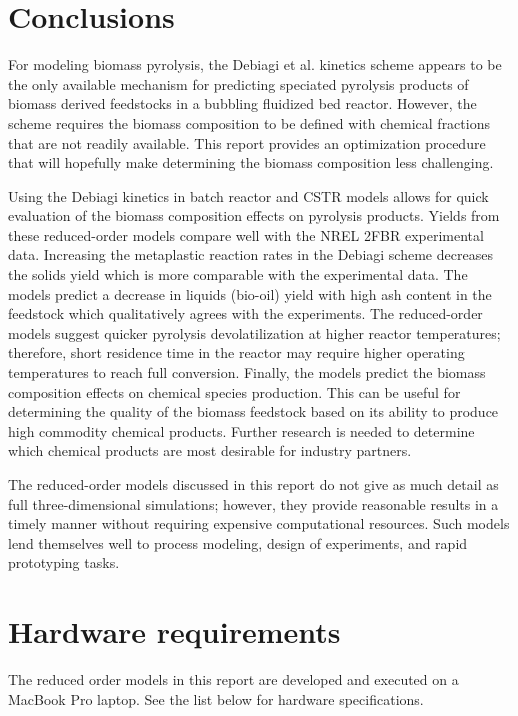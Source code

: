 
\section{Conclusions}

For modeling biomass pyrolysis, the Debiagi et al. kinetics scheme appears to be the only available mechanism for predicting speciated pyrolysis products of biomass derived feedstocks in a bubbling fluidized bed reactor. However, the scheme requires the biomass composition to be defined with chemical fractions that are not readily available. This report provides an optimization procedure that will hopefully make determining the biomass composition less challenging.

Using the Debiagi kinetics in batch reactor and CSTR models allows for quick evaluation of the biomass composition effects on pyrolysis products. Yields from these reduced-order models compare well with the NREL 2FBR experimental data. Increasing the metaplastic reaction rates in the Debiagi scheme decreases the solids yield which is more comparable with the experimental data. The models predict a decrease in liquids (bio-oil) yield with high ash content in the feedstock which qualitatively agrees with the experiments. The reduced-order models suggest quicker pyrolysis devolatilization at higher reactor temperatures; therefore, short residence time in the reactor may require higher operating temperatures to reach full conversion. Finally, the models predict the biomass composition effects on chemical species production. This can be useful for determining the quality of the biomass feedstock based on its ability to produce high commodity chemical products. Further research is needed to determine which chemical products are most desirable for industry partners.

The reduced-order models discussed in this report do not give as much detail as full three-dimensional simulations; however, they provide reasonable results in a timely manner without requiring expensive computational resources. Such models lend themselves well to process modeling, design of experiments, and rapid prototyping tasks.

\section{Hardware requirements}

The reduced order models in this report are developed and executed on a MacBook Pro laptop. See the list below for hardware specifications.


